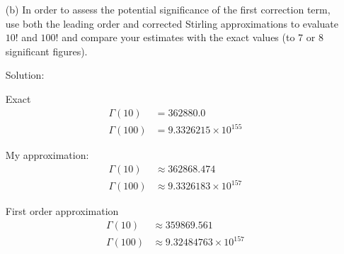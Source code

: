 \begin{homeworkProblem}
\begin{enumerate}
\begin{callout}{Solution:}
And $\frac{d\tau}{d\beta}$ can be found by taking a derivative:
\begin{align*}
    \frac{d\tau}{d\beta} = \frac{d \epsilon}{d\beta} = a_{1}+2a_{2}\beta + 3a_3 \beta^{2} + \dots
\end{align*}

So the integral will look like 
\begin{align*}
    \Gamma(x+1) &= x^{x+1} \int_{-\infty}^{\infty}  \,d\beta \left( a_{1}+2a_{2}\beta+3a_{3}\beta^{2}+\dots \right) e^{x(-1-\beta^{2})} \\
                &= x^{x+1}e^{-x} \int_{-\infty}^{\infty}  \,d\beta \left( \sqrt{2} + \frac{4}{3}\beta + \frac{\sqrt{2}}{6}\beta^{2} \right) e^{-x\beta^{2}} \\
\end{align*}

A quick look at a gaussian integrals table gives:
$$ \Gamma(x+1)=x^{x+1} e^{-x} \sqrt{\frac{\pi}{x}}\left[\sqrt{2}+\frac{\sqrt{2}}{12 x}+\ldots\right]=\sqrt{2 \pi} x^{x+1 / 2} e^{-x}\left(1+\frac{1}{12 x}+\ldots\right) $$

            \end{callout}

        \item[(b)] In order to assess the potential significance of the first correction term, use both the leading order and corrected Stirling approximations to evaluate $10!$ and $100!$ and compare your estimates with the exact values (to 7 or 8 significant figures).
            \begin{callout}{Solution:}

                Exact
            \begin{align*}
                \Gamma(10) &= 362880.0 \\
                \Gamma(100) &= 9.3326215 \times 10^{155}
            \end{align*}

            My approximation:
            \begin{align*}
                \Gamma(10) &\approx 362868.474 \\
                \Gamma(100) &\approx 9.3326183\times10^{157}
            \end{align*}

            First order approximation
            \begin{align*}
                \Gamma(10) &\approx 359869.561 \\
                \Gamma(100) &\approx 9.32484763\times10^{157}
            \end{align*}

            \end{callout}
    \end{enumerate}
\end{homeworkProblem}

